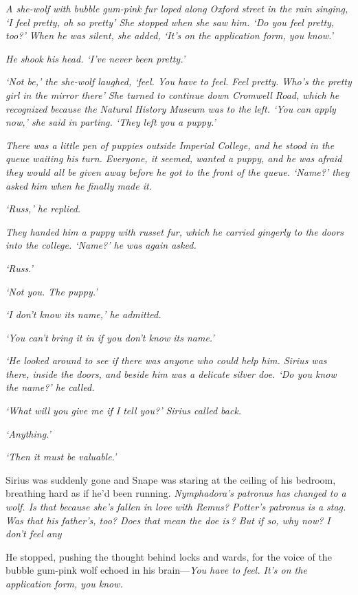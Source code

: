 \sbreak

\emph{A she-wolf with bubble gum-pink fur loped along Oxford street in the rain singing, `I feel pretty, oh so pretty{\el}' She stopped when she saw him. `Do you feel pretty, too?' When he was silent, she added, `It's on the application form, you know.'}

\emph{He shook his head. `I've never been pretty.'}

\emph{`Not be,' the she-wolf laughed, `feel. You have to feel. Feel pretty. Who's the pretty girl in the mirror there{\el}' She turned to continue down Cromwell Road, which he recognized because the Natural History Museum was to the left. `You can apply now,' she said in parting. `They left you a puppy.'}

\emph{There was a little pen of puppies outside Imperial College, and he stood in the queue waiting his turn. Everyone, it seemed, wanted a puppy, and he was afraid they would all be given away before he got to the front of the queue. `Name?' they asked him when he finally made it.}

\emph{`Russ,' he replied.}

\emph{They handed him a puppy with russet fur, which he carried gingerly to the doors into the college. `Name?' he was again asked.}

\emph{`Russ.'}

\emph{`Not you. The puppy.'}

\emph{`I don't know its name,' he admitted.}

\emph{`You can't bring it in if you don't know its name.'}

\emph{`He looked around to see if there was anyone who could help him. Sirius was there, inside the doors, and beside him was a delicate silver doe. `Do you know the name?' he called.}

\emph{`What will you give me if I tell you?' Sirius called back.}

\emph{`Anything.'}

\emph{`Then it must be valuable.'}

Sirius was suddenly gone and Snape was staring at the ceiling of his bedroom, breathing hard as if he'd been running. \emph{Nymphadora's patronus has changed to a wolf. Is that because she's fallen in love with Remus? Potter's patronus is a stag. Was that his father's, too? Does that mean the doe is{\el}\,? But if so, why now? I don't feel any{\el}}

He stopped, pushing the thought behind locks and wards, for the voice of the bubble gum-pink wolf echoed in his brain—\emph{You have to feel. It's on the application form, you know.} 


